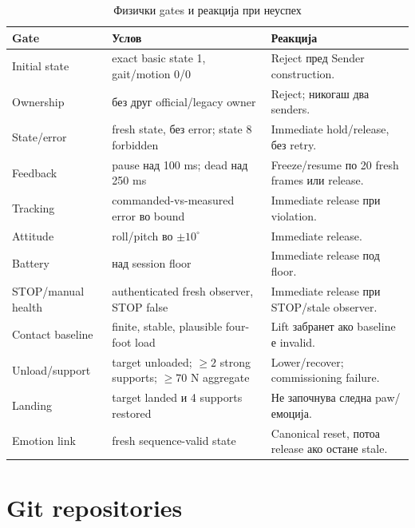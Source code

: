 \begin{table}[htbp]
\centering
\caption{Физички gates и реакција при неуспех}
\label{tab:gates}
\small
\begin{tabularx}{\textwidth}{L{0.25\textwidth}YL{0.31\textwidth}}
\toprule
\textbf{Gate} & \textbf{Услов} & \textbf{Реакција} \\
\midrule
Initial state & exact basic state 1, gait/motion 0/0 & Reject пред Sender construction. \\
Ownership & без друг official/legacy owner & Reject; никогаш два senders. \\
State/error & fresh state, без error; state 8 forbidden & Immediate hold/release, без retry. \\
Feedback & pause над 100 ms; dead над 250 ms & Freeze/resume по 20 fresh frames или release. \\
Tracking & commanded-vs-measured error во bound & Immediate release при violation. \\
Attitude & roll/pitch во $\pm10^{\circ}$ & Immediate release. \\
Battery & над session floor & Immediate release под floor. \\
STOP/manual health & authenticated fresh observer, STOP false & Immediate release при STOP/stale observer. \\
Contact baseline & finite, stable, plausible four-foot load & Lift забранет ако baseline е invalid. \\
Unload/support & target unloaded; $\ge2$ strong supports; $\ge70$ N aggregate & Lower/recover; commissioning failure. \\
Landing & target landed и 4 supports restored & Не започнува следна paw/емоција. \\
Emotion link & fresh sequence-valid state & Canonical reset, потоа release ако остане stale. \\
\bottomrule
\end{tabularx}
\end{table}

\section{Git repositories}

